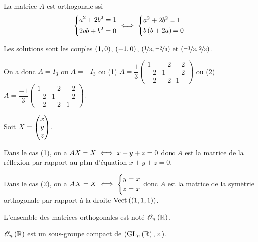 \begin{corr}
La matrice \(A\) est orthogonale ssi \[\begin{dcases}
a^2+2b^2=1 \\
2ab+b^2=0
\end{dcases}\iff\begin{dcases}
a^2+2b^2=1 \\
b\left(b+2a\right)=0
\end{dcases}\]

Les solutions sont les couples \(\left(1,0\right)\), \(\left(-1,0\right)\), \(\left(\nicefrac{1}{3},\nicefrac{-2}{3}\right)\) et \(\left(\nicefrac{-1}{3},\nicefrac{2}{3}\right)\).

On a donc \(A=I_3\) ou \(A=-I_3\) ou (1) \(A=\dfrac{1}{3}\begin{pmatrix}
1 & -2 & -2 \\
-2 & 1 & -2 \\
-2 & -2 & 1
\end{pmatrix}\) ou (2) \(A=\dfrac{-1}{3}\begin{pmatrix}
1 & -2 & -2 \\
-2 & 1 & -2 \\
-2 & -2 & 1
\end{pmatrix}\).

Soit \(X=\begin{pmatrix}x\\y\\z\end{pmatrix}\).

Dans le cas (1), on a \(AX=X\iff x+y+z=0\) donc \(A\) est la matrice de la réflexion par rapport au plan d'équation \(x+y+z=0\).

Dans le cas (2), on a \(AX=X\iff\begin{dcases}
y=x \\
z=x
\end{dcases}\) donc \(A\) est la matrice de la symétrie orthogonale par rapport à la droite \(\Vect{\paren{1,1,1}}\).
\end{corr}

L'ensemble des matrices orthogonales est noté \(\Orth{n}[\R]\).

\begin{prop}
\(\Orth{n}[\R]\) est un sous-groupe compact de \(\groupe{\GL{n}[\R]}[\times]\).
\end{prop}

